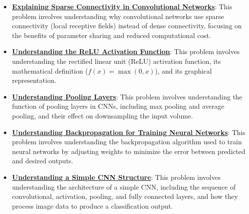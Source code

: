 \documentclass{article}%
\begin{document}
\begin{itemize}[leftmargin=*]
\item \href{https://purdue.brightspace.com/d2l/common/assets/pdfjs-d2l-dist/1.0.14-legacy/web/viewer.html?file=\%2Fcontent\%2Fenforced\%2F1095467-wl.202510.CS.24300.001\%2F09L1-cnn.pdf\%3Fou\%3D1095467\&lang=en-us\&container=d2l-fileviewer-rendered-pdf\&fullscreen=d2l-fileviewer-rendered-pdf-dialog\&height=667#page=10}{\textbf{Explaining Sparse Connectivity in Convolutional Networks}}: This problem involves understanding why convolutional networks use sparse connectivity (local receptive fields) instead of dense connectivity, focusing on the benefits of parameter sharing and reduced computational cost.%
\item \href{https://purdue.brightspace.com/d2l/common/assets/pdfjs-d2l-dist/1.0.14-legacy/web/viewer.html?file=\%2Fcontent\%2Fenforced\%2F1095467-wl.202510.CS.24300.001\%2F09L1-cnn.pdf\%3Fou\%3D1095467\&lang=en-us\&container=d2l-fileviewer-rendered-pdf\&fullscreen=d2l-fileviewer-rendered-pdf-dialog\&height=667#page=13}{\textbf{Understanding the ReLU Activation Function}}: This problem involves understanding the rectified linear unit (ReLU) activation function, its mathematical definition ($f(x) = \max(0, x)$), and its graphical representation.%
\item \href{https://purdue.brightspace.com/d2l/common/assets/pdfjs-d2l-dist/1.0.14-legacy/web/viewer.html?file=\%2Fcontent\%2Fenforced\%2F1095467-wl.202510.CS.24300.001\%2F09L1-cnn.pdf\%3Fou\%3D1095467\&lang=en-us\&container=d2l-fileviewer-rendered-pdf\&fullscreen=d2l-fileviewer-rendered-pdf-dialog\&height=667#page=14}{\textbf{Understanding Pooling Layers}}: This problem involves understanding the function of pooling layers in CNNs, including max pooling and average pooling, and their effect on downsampling the input volume.%
\item \href{https://purdue.brightspace.com/d2l/common/assets/pdfjs-d2l-dist/1.0.14-legacy/web/viewer.html?file=\%2Fcontent\%2Fenforced\%2F1095467-wl.202510.CS.24300.001\%2F09L1-cnn.pdf\%3Fou\%3D1095467\&lang=en-us\&container=d2l-fileviewer-rendered-pdf\&fullscreen=d2l-fileviewer-rendered-pdf-dialog\&height=667#page=16}{\textbf{Understanding Backpropagation for Training Neural Networks}}: This problem involves understanding the backpropagation algorithm used to train neural networks by adjusting weights to minimize the error between predicted and desired outputs.%
\item \href{https://purdue.brightspace.com/d2l/common/assets/pdfjs-d2l-dist/1.0.14-legacy/web/viewer.html?file=\%2Fcontent\%2Fenforced\%2F1095467-wl.202510.CS.24300.001\%2F09L1-cnn.pdf\%3Fou\%3D1095467\&lang=en-us\&container=d2l-fileviewer-rendered-pdf\&fullscreen=d2l-fileviewer-rendered-pdf-dialog\&height=667#page=17}{\textbf{Understanding a Simple CNN Structure}}: This problem involves understanding the architecture of a simple CNN, including the sequence of convolutional, activation, pooling, and fully connected layers, and how they process image data to produce a classification output.%

\end{itemize}
\end{document}
